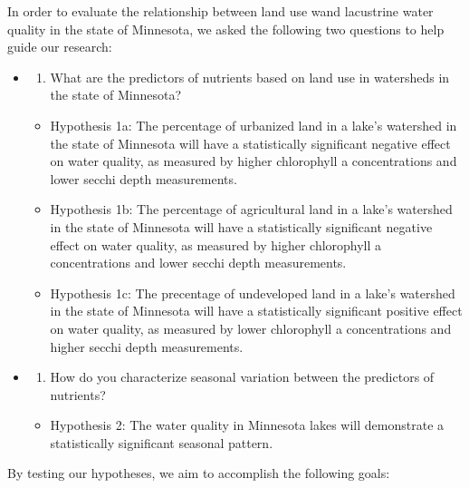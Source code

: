 \documentclass[12pt,]{article}
\providecommand{\tightlist}{%
  \setlength{\itemsep}{0pt}\setlength{\parskip}{0pt}}
\begin{document}
In order to evaluate the relationship between land use wand lacustrine
water quality in the state of Minnesota, we asked the following two
questions to help guide our research:

\begin{itemize}
\item
  \begin{enumerate}
  \def\labelenumi{\arabic{enumi}.}
  \tightlist
  \item
    What are the predictors of nutrients based on land use in watersheds
    in the state of Minnesota?
  \end{enumerate}

  \begin{itemize}
  \tightlist
  \item
    Hypothesis 1a: The percentage of urbanized land in a lake's
    watershed in the state of Minnesota will have a statistically
    significant negative effect on water quality, as measured by higher
    chlorophyll a concentrations and lower secchi depth measurements.
  \item
    Hypothesis 1b: The percentage of agricultural land in a lake's
    watershed in the state of Minnesota will have a statistically
    significant negative effect on water quality, as measured by higher
    chlorophyll a concentrations and lower secchi depth measurements.
  \item
    Hypothesis 1c: The precentage of undeveloped land in a lake's
    watershed in the state of Minnesota will have a statistically
    significant positive effect on water quality, as measured by lower
    chlorophyll a concentrations and higher secchi depth measurements.
  \end{itemize}
\item
  \begin{enumerate}
  \def\labelenumi{\arabic{enumi}.}
  \setcounter{enumi}{1}
  \tightlist
  \item
    How do you characterize seasonal variation between the predictors of
    nutrients?
  \end{enumerate}

  \begin{itemize}
  \tightlist
  \item
    Hypothesis 2: The water quality in Minnesota lakes will demonstrate
    a statistically significant seasonal pattern.
  \end{itemize}
\end{itemize}

By testing our hypotheses, we aim to accomplish the following goals:
\end{document}
